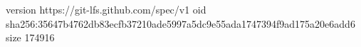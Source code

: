 version https://git-lfs.github.com/spec/v1
oid sha256:35647b4762db83ecfb37210ade5997a5dc9e55ada1747394f9ad175a20e6add6
size 174916

